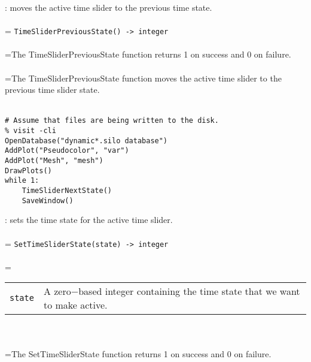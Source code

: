 \documentclass[10pt,a4paper]{report}
\begin{document}
{}
: moves the active time slider to the previous time state.\\[-3mm]

 \\ 
\hangindent=\parindent 
\verb!TimeSliderPreviousState() -> integer!\\ [-3mm]

 \\ 
\hangindent=\parindent The TimeSliderPreviousState function returns 1 on success and 0 on failure. \\[-3mm] 

 \\ 
\hangindent=\parindent The TimeSliderPreviousState function moves the active time slider to the previous time slider state. \\[-3mm] 

\\[-6mm]
\begin{verbatim}# Assume that files are being written to the disk.
% visit -cli
OpenDatabase("dynamic*.silo database")
AddPlot("Pseudocolor", "var")
AddPlot("Mesh", "mesh")
DrawPlots()
while 1:
    TimeSliderNextState()
    SaveWindow()
\end{verbatim}
\newpage


{}
: sets the time state for the active time slider.\\[-3mm]

 \\ 
\hangindent=\parindent 
\verb!SetTimeSliderState(state) -> integer!\\ [-3mm]

 \\ 
\hangindent=\parindent 
\begin{tabular}{lp{9cm}}
\verb!state! & A zero$-$based integer containing the time state that we want to make active. \\
\end{tabular} \\[-2mm]


 \\ 
\hangindent=\parindent The SetTimeSliderState function returns 1 on success and 0 on failure. \\[-3mm] 
\end{document}
